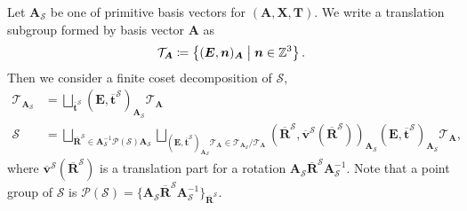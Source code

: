 Let $\bm{A}_{\mathcal{S}}$ be one of primitive basis vectors for $(\bm{A}, \bm{X}, \bm{T})$.
We write a translation subgroup formed by basis vector $\bm{A}$ as
\begin{align}
  \mathcal{T}_{\bm{A}} \coloneqq \left\{  (\bm{E}, \bm{n})_{\bm{A}}  \mathrel{}\middle|\mathrel{}  \bm{n} \in \mathbb{Z}^{3}  \right\}.
\end{align}
Then we consider a finite coset decomposition of $\mathcal{S}$,
\begin{align}
  \mathcal{T}_{\bm{A}_{\mathcal{S}}}
    &= \bigsqcup_{ \overline{ \bm{t} }^{\mathcal{S}} }
      \left( \bm{E}, \overline{ \bm{t} }^{\mathcal{S}} \right)_{ \bm{A}_{\mathcal{S}} }
      \mathcal{T}_{\bm{A}} \\
  \mathcal{S}
    &= \bigsqcup_{
          \overline{\bm{R}}^{\mathcal{S}} \in \bm{A}_{\mathcal{S}}^{-1} \mathcal{P}(\mathcal{S}) \bm{A}_{\mathcal{S}}
      }
      \bigsqcup_{
          \left( \bm{E}, \overline{ \bm{t} }^{\mathcal{S}} \right)_{ \bm{A}_{\mathcal{S}} } \mathcal{T}_{\bm{A}}
          \in \mathcal{T}_{\bm{A}_{\mathcal{S}}} / \mathcal{T}_{\bm{A}}
      }
      \left(
        \overline{\bm{R}}^{\mathcal{S}},
        \overline{ \bm{v} }^{\mathcal{S}}(\overline{\bm{R}}^{\mathcal{S}})
      \right)_{ \bm{A}_{\mathcal{S}} }
      \left( \bm{E}, \overline{ \bm{t} }^{\mathcal{S}} \right)_{ \bm{A}_{\mathcal{S}} }
      \mathcal{T}_{\bm{A}},
\end{align}
where $\overline{ \bm{v} }^{\mathcal{S}}(\overline{\bm{R}}^{\mathcal{S}})$ is a translation part for a rotation $\bm{A}_{\mathcal{S}} \overline{\bm{R}}^{\mathcal{S}} \bm{A}_{\mathcal{S}}^{-1}$.
Note that a point group of $\mathcal{S}$ is $\mathcal{P}(\mathcal{S}) = \{ \bm{A}_{\mathcal{S}} \overline{\bm{R}}^{\mathcal{S}} \bm{A}_{\mathcal{S}}^{-1} \}_{ \overline{\bm{R}}^{\mathcal{S}} }$.

